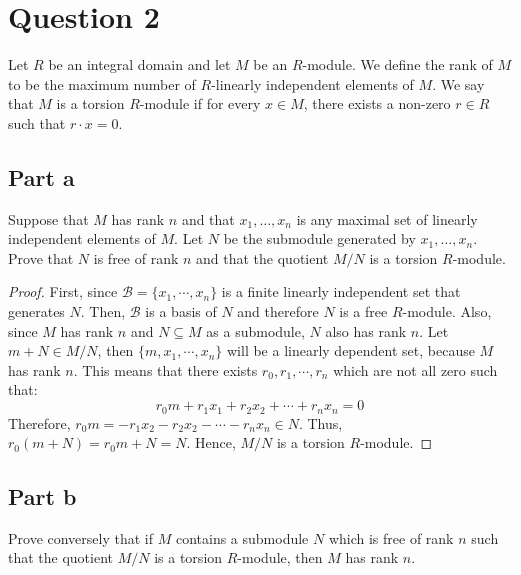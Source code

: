 \section{Question 2}

\begin{question}
    Let $R$ be an integral domain and let $M$ be an $R$-module. We define the rank of $M$ to be the maximum number of $R$-linearly independent elements of $M$. We say that $M$ is a torsion $R$-module if for every $x \in M$, there exists a non-zero $r \in R$ such that $r \cdot x=0$.
\end{question}

\subsection{Part a}

\begin{question}
    Suppose that $M$ has rank $n$ and that $x_1, \ldots, x_n$ is any maximal set of linearly independent elements of $M$. Let $N$ be the submodule generated by $x_1, \ldots, x_n$. Prove that $N$ is free of rank $n$ and that the quotient $M / N$ is a torsion $R$-module.
\end{question}

\begin{answer}
    \begin{proof}
        First, since $\mathcal{B} = \{x_1,\cdots,x_n\}$ is a finite linearly independent set that generates $N$. Then, $\mathcal{B}$ is a basis of $N$ and therefore $N$ is a free $R$-module. Also, since $M$ has rank $n$ and $N \subseteq M$ as a submodule, $N$ also has rank $n$. Let $m + N \in M/N$, then $\{m, x_1,\cdots,x_n\}$ will be a linearly dependent set, because $M$ has rank $n$. This means that there exists $r_0,r_1,\cdots,r_n$ which are not all zero such that:
        \begin{equation}
            r_0m + r_1x_1 + r_2x_2 + \cdots + r_nx_n = 0
        \end{equation}
        Therefore, $r_0m = -r_1x_2 - r_2x_2 - \cdots - r_nx_n \in N$. Thus, $r_0(m+N) = r_0m + N = N$. Hence, $M/N$ is a torsion $R$-module.
    \end{proof}
\end{answer}

\subsection{Part b}

\begin{question}
    Prove conversely that if $M$ contains a submodule $N$ which is free of rank $n$ such that the quotient $M / N$ is a torsion $R$-module, then $M$ has rank $n$.
\end{question}

